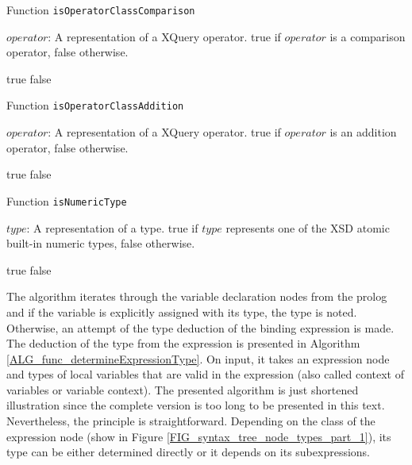 \begin{algorithm}
\caption{Function \texttt{isOperatorClassComparison}}
\label{ALG_func_isOperatorClassComparison}
\begin{algorithmic}[1]
\REQUIRE $operator$: A representation of a XQuery operator.
\ENSURE true if $operator$ is a comparison operator, false otherwise.

    \RETURN true
\ELSE
    \RETURN false
\ENDIF
\end{algorithmic}
\end{algorithm}

\begin{algorithm}
\caption{Function \texttt{isOperatorClassAddition}}
\label{ALG_func_isOperatorClassAddition}
\begin{algorithmic}[1]
\REQUIRE $operator$: A representation of a XQuery operator.
\ENSURE true if $operator$ is an addition operator, false otherwise.

    \RETURN true
\ELSE
    \RETURN false
\ENDIF
\end{algorithmic}
\end{algorithm}

\begin{algorithm}
\caption{Function \texttt{isNumericType}}
\label{ALG_func_isNumericType}
\begin{algorithmic}[1]
\REQUIRE $type$: A representation of a type.
\ENSURE true if $type$ represents one of the XSD atomic built-in numeric types, false otherwise.

    \RETURN true
\ELSE
    \RETURN false
\ENDIF
\end{algorithmic}
\end{algorithm}

The algorithm iterates through the variable declaration nodes from the prolog and if the variable is explicitly assigned with its type, the type is noted. Otherwise, an attempt of the type deduction of the binding expression is made. The deduction of the type from the expression is presented in Algorithm \ref{ALG_func_determineExpressionType}. On input, it takes an expression node and types of local variables that are valid in the expression (also called context of variables or variable context). The presented algorithm is just shortened illustration since the complete version is too long to be presented in this text. Nevertheless, the principle is straightforward. Depending on the class of the expression node (show in Figure \ref{FIG_syntax_tree_node_types_part_1}), its type can be either determined directly or it depends on its subexpressions.

